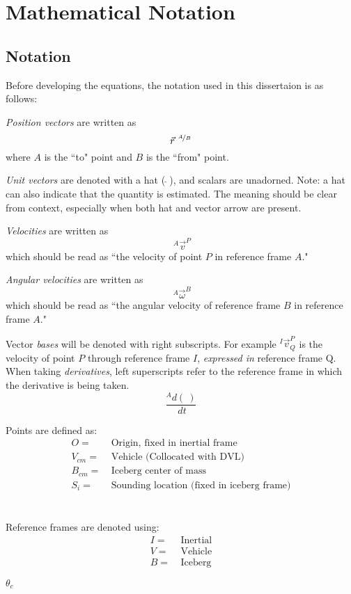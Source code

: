 
\chapter{Mathematical Notation}
\label{ch.Notation}
\section{Notation}

Before developing the equations, the notation used in this dissertaion is as follows:

\emph{Position vectors} are written as
\begin{equation*}
 \vec{r}^{~\nicefrac{A}{B}} 
\end{equation*}
where $A$ is the ``to" point and $B$ is the ``from" point.

\emph{Unit vectors} are denoted with a hat ($~\hat{}~$), and scalars are unadorned. Note: a hat can also indicate that the quantity is estimated. The meaning should be clear from context, especially when both hat and vector arrow are present.

\emph{Velocities} are written as 
\begin{equation*} 
~^{A}\vec{v}^{P} 
\end{equation*}
which should be read as ``the velocity of point $P$ in reference frame $A$."

\emph{Angular velocities} are written as 
\begin{equation*}
 ~^{A}\vec{\omega}^{B}
\end{equation*}
which should be read as ``the angular velocity of reference frame $B$ in reference frame $A$."

Vector \emph{bases} will be denoted with right subscripts. For example $^I\vec{v}^P_{Q}$ is the velocity of point $P$ through reference frame $I$, \emph{expressed in} reference frame Q.   
When taking \emph{derivatives}, left superscripts refer to the reference frame in which the derivative is being taken.
\begin{equation*}
 \frac{^{A}d(~)}{~dt}
\end{equation*}

Points are defined as:
\begin{align*}
O =&~ \text{Origin, fixed in inertial frame}\\
V_{cm} =&~ \text{Vehicle (Collocated with DVL)} \\
B_{cm} =&~ \text{Iceberg center of mass}\\
S_i =&~ \text{Sounding location (fixed in iceberg frame)}
\end{align*}
\\
\\
Reference frames are denoted using:
\begin{align*}
I =&~ \text{Inertial}\\
V =&~ \text{Vehicle} \\
B =&~ \text{Iceberg}
\end{align*}

$\theta_c$